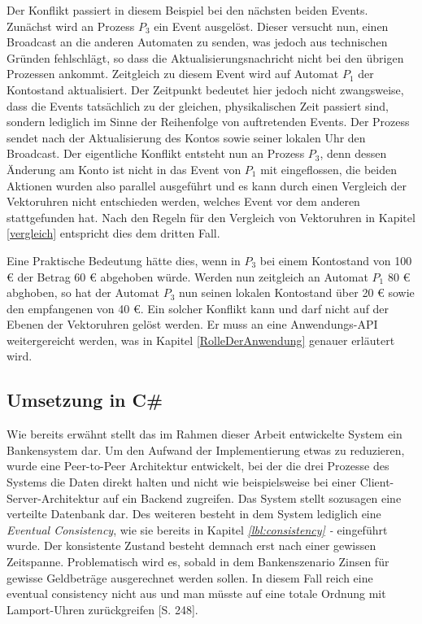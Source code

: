 Der Konflikt passiert in diesem Beispiel bei den nächsten beiden Events. Zunächst wird an Prozess $P_3$ ein Event ausgelöst. Dieser versucht nun, einen Broadcast an die anderen Automaten zu senden, was jedoch aus technischen Gründen fehlschlägt, so dass die Aktualisierungsnachricht nicht bei den übrigen Prozessen ankommt. Zeitgleich zu diesem Event wird auf Automat $P_1$ der Kontostand aktualisiert. Der Zeitpunkt  bedeutet hier jedoch nicht zwangsweise, dass die Events tatsächlich zu der gleichen, physikalischen Zeit passiert sind, sondern lediglich im Sinne der Reihenfolge von auftretenden Events. Der Prozess sendet nach der Aktualisierung des Kontos sowie seiner lokalen Uhr den Broadcast. Der eigentliche Konflikt entsteht nun an Prozess $P_3$, denn dessen Änderung am Konto ist nicht in das Event von $P_1$ mit eingeflossen, die beiden Aktionen wurden also parallel ausgeführt und es kann durch einen Vergleich der Vektoruhren nicht entschieden werden, welches Event vor dem anderen stattgefunden hat. Nach den Regeln für den Vergleich von Vektoruhren in Kapitel \ref{vergleich} entspricht dies dem dritten Fall.

Eine Praktische Bedeutung hätte dies, wenn in $P_3$ bei einem Kontostand von 100 \euro{} der Betrag 60 \euro{} abgehoben würde. Werden nun zeitgleich an Automat $P_1$ 80 \euro{} abghoben, so hat der Automat $P_3$ nun seinen lokalen Kontostand über 20 \euro{} sowie den empfangenen von 40 \euro{}. Ein solcher Konflikt kann und darf nicht auf der Ebenen der Vektoruhren gelöst werden. Er muss an eine Anwendungs-API weitergereicht werden, was in Kapitel \ref{RolleDerAnwendung} genauer erläutert wird.  

\subsection{Umsetzung in C\#}
\label{vectorClockImpl}
Wie bereits erwähnt stellt das im Rahmen dieser Arbeit entwickelte System ein Bankensystem dar. Um den Aufwand der Implementierung etwas zu reduzieren, wurde eine Peer-to-Peer Architektur entwickelt, bei der die drei Prozesse des Systems die Daten direkt halten und nicht wie beispielsweise bei einer Client-Server-Architektur auf ein Backend zugreifen. Das System stellt sozusagen eine verteilte Datenbank dar.
Des weiteren besteht in dem System lediglich eine \textit{Eventual Consistency}, wie sie bereits in Kapitel \textit{\ref{lbl:consistency} - } eingeführt wurde. Der konsistente Zustand besteht demnach erst nach einer gewissen Zeitspanne. Problematisch wird es, sobald in dem Bankenszenario Zinsen für gewisse Geldbeträge ausgerechnet werden sollen. In diesem Fall reich eine eventual consistency nicht aus und man müsste auf eine totale Ordnung mit Lamport-Uhren zurückgreifen \cite{Tanenbaum2007}[S. 248].

